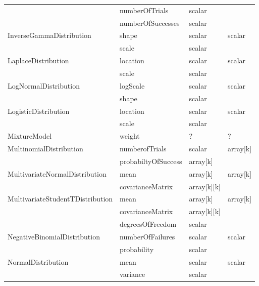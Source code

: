\documentclass[draftspec]{sbmlpkgspec}
\begin{document}
\begin{longtable}[c]{ l l l l }
                                             & numberOfTrials & scalar &\\
                                             & numberOfSuccesses & scalar &\\\midrule
InverseGammaDistribution & shape & scalar & scalar \\
                                & scale & scalar &  \\\midrule
LaplaceDistribution & location & scalar & scalar\\
                                  & scale & scalar & \\\midrule
LogNormalDistribution & logScale & scalar & scalar \\
                                     & shape & scalar & \\\midrule
LogisticDistribution & location & scalar & scalar \\
                                & scale & scalar & \\\midrule
MixtureModel & weight & ? & ? \\\midrule
MultinomialDistribution & numberofTrials & scalar & array[k]\\
                                       & probabiltyOfSuccess &
                                       array[k]\\\midrule
MultivariateNormalDistribution & mean & array[k] & array[k] \\
                                                  & covarianceMatrix & array[k][k] & \\\midrule
MultivariateStudentTDistribution & mean & array[k] & array[k] \\
                                                         & covarianceMatrix & array[k][k]\\
                                                         &
                                                         degreesOfFreedom
                                                         & scalar
                                                         \\\midrule
NegativeBinomialDistribution & numberOfFailures & scalar & scalar \\
                                               & probability & scalar
                                               & \\\midrule
NormalDistribution & mean & scalar & scalar \\
                                & variance & scalar & \\\midrule

\end{longtable}
\end{document}
